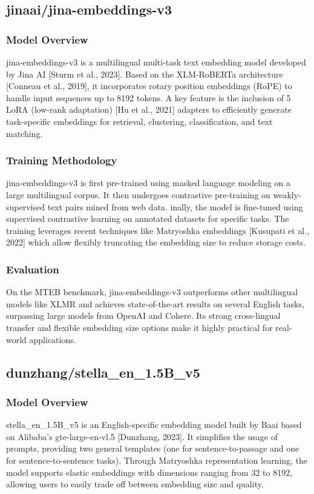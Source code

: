 \subsection{jinaai/jina-embeddings-v3}\label{subsec:jinaai}

\subsubsection{Model Overview}
jina-embeddings-v3 is a multilingual multi-task text embedding model developed by Jina AI [Sturm et al., 2023].
Based on the XLM-RoBERTa architecture [Conneau et al., 2019], it incorporates rotary position embeddings (RoPE) to handle input sequences up to 8192 tokens.
A key feature is the inclusion of 5 LoRA (low-rank adaptation) [Hu et al., 2021] adapters to efficiently generate task-specific embeddings for retrieval, clustering, classification, and text matching.

\subsubsection{Training Methodology}
jina-embeddings-v3 is first pre-trained using masked language modeling on a large multilingual corpus.
It then undergoes contrastive pre-training on weakly-supervised text pairs mined from web data.
inally, the model is fine-tuned using supervised contrastive learning on annotated datasets for specific tasks.
The training leverages recent techniques like Matryoshka embeddings [Kusupati et al., 2022] which allow flexibly truncating the embedding size to reduce storage costs.

\subsubsection{Evaluation}
On the MTEB benchmark, jina-embeddings-v3 outperforms other multilingual models like XLMR and achieves state-of-the-art results on several English tasks, surpassing large models from OpenAI and Cohere.
Its strong cross-lingual transfer and flexible embedding size options make it highly practical for real-world applications.

\subsection{dunzhang/stella\_en\_1.5B\_v5}\label{subsec:dunzhang}

\subsubsection{Model Overview}
stella\_en\_1.5B\_v5 is an English-specific embedding model built by Baai based on Alibaba's gte-large-en-vl.5 [Dunzhang, 2023]. It simplifies the usage of prompts, providing two general templates (one for sentence-to-passage and one for sentence-to-sentence tasks). Through Matryoshka representation learning, the model supports elastic embeddings with dimensions ranging from 32 to 8192, allowing users to easily trade off between embedding size and quality.


